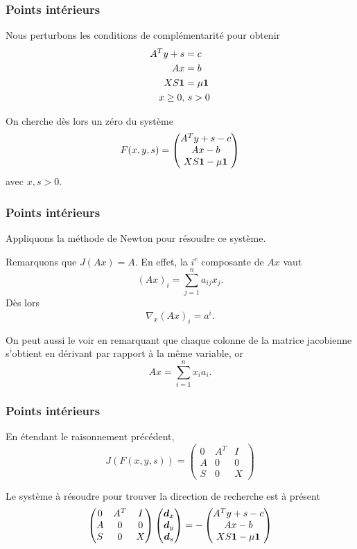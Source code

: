 \documentclass[usepdftitle=false, aspectratio=169]{beamer}
\begin{document}
\begin{frame}
\frametitle{Points intérieurs}

Nous perturbons les conditions de complémentarité pour obtenir
\begin{align*}
A^T y + s &= c \\
Ax &= b \\
XS{\boldsymbol{1}} &= \mu{\boldsymbol{1}} \\
x \geq 0,&\ s > 0
\end{align*}

On cherche dès lors un zéro du système
$$
F(x,y,s) =
\begin{pmatrix}
A^T y + s - c \\
Ax - b \\
XS{\boldsymbol{1}} - \mu{\boldsymbol{1}}
\end{pmatrix}
$$
avec $x, s > 0$.

\end{frame}

\begin{frame}
\frametitle{Points intérieurs}

Appliquons la méthode de Newton pour résoudre ce système.

\mbox{}

Remarquons que $J(Ax) = A$. En effet, la $i^e$ composante de $Ax$ vaut
$$
(Ax)_i = \sum_{j = 1}^n a_{ij} x_j.
$$
Dès lors
$$
\nabla_x (Ax)_i = a^i.
$$

\mbox{}

On peut aussi le voir en remarquant que chaque colonne de la matrice jacobienne s'obtient en dérivant par rapport à la même variable, or
$$
Ax = \sum_{i = 1}^n x_i a_i.
$$

\end{frame}

\begin{frame}
\frametitle{Points intérieurs}

En étendant le raisonnement précédent,
$$
J(F(x,y,s)) =
\begin{pmatrix}
	0 & A^T & I \\
	A & 0 & 0 \\
	S & 0 & X
\end{pmatrix}
$$

\mbox{}

Le système à résoudre pour trouver la direction de recherche est à présent
$$
\begin{pmatrix}
	0 & A^T & I \\
	A & 0 & 0 \\
	S & 0 & X
\end{pmatrix}
\begin{pmatrix}
	{\boldsymbol{d}}_x \\ {\boldsymbol{d}}_y \\ {\boldsymbol{d}}_s
\end{pmatrix}
=
-
\begin{pmatrix}
	A^Ty+s-c \\ Ax-b \\ XS{\boldsymbol{1}} - \mu{\boldsymbol{1}}
\end{pmatrix}
$$

\end{frame}
\end{document}
